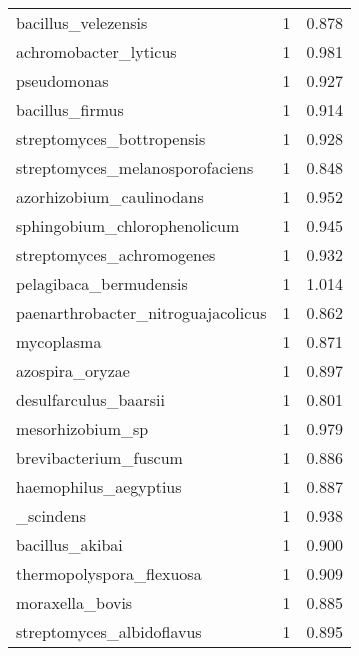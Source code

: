 \begin{tabular}{lrr}
                         bacillus\_velezensis &                   1 &     0.878 \\
                       achromobacter\_lyticus &                   1 &     0.981 \\
                                 pseudomonas &                   1 &     0.927 \\
                             bacillus\_firmus &                   1 &     0.914 \\
                   streptomyces\_bottropensis &                   1 &     0.928 \\
             streptomyces\_melanosporofaciens &                   1 &     0.848 \\
                    azorhizobium\_caulinodans &                   1 &     0.952 \\
                sphingobium\_chlorophenolicum &                   1 &     0.945 \\
                   streptomyces\_achromogenes &                   1 &     0.932 \\
                      pelagibaca\_bermudensis &                   1 &     1.014 \\
          paenarthrobacter\_nitroguajacolicus &                   1 &     0.862 \\
                                  mycoplasma &                   1 &     0.871 \\
                             azospira\_oryzae &                   1 &     0.897 \\
                       desulfarculus\_baarsii &                   1 &     0.801 \\
                            mesorhizobium\_sp &                   1 &     0.979 \\
                       brevibacterium\_fuscum &                   1 &     0.886 \\
                       haemophilus\_aegyptius &                   1 &     0.887 \\
                      [clostridium]\_scindens &                   1 &     0.938 \\
                             bacillus\_akibai &                   1 &     0.900 \\
                    thermopolyspora\_flexuosa &                   1 &     0.909 \\
                             moraxella\_bovis &                   1 &     0.885 \\
                   streptomyces\_albidoflavus &                   1 &     0.895 \\

\end{tabular}
